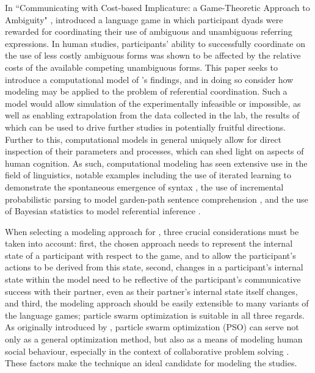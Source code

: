 \documentclass[12pt,a4paper]{article}
\begin{document}
In ``Communicating with Cost-based Implicature: a Game-Theoretic Approach to Ambiguity" \citeyearpar{rohde2012}, \citeauthor{rohde2012} introduced a language game in which participant dyads were rewarded for coordinating their use of ambiguous and unambiguous referring expressions. In human studies, participants' ability to successfully coordinate on the use of less costly ambiguous forms was shown to be affected by the relative costs of the available competing unambiguous forms. This paper seeks to introduce a computational model of \citeauthor{rohde2012}'s findings, and in doing so consider how modeling may be applied to the problem of referential coordination. Such a model would allow simulation of the experimentally infeasible or impossible, as well as enabling extrapolation from the data collected in the lab, the results of which can be used to drive further studies in potentially fruitful directions. Further to this, computational models in general uniquely allow for direct inspection of their parameters and processes, which can shed light on aspects of human cognition. As such, computational modeling has seen extensive use in the field of linguistics, notable examples including the use of iterated learning to demonstrate the spontaneous emergence of syntax \citep{kirby2002}, the use of incremental probabilistic parsing to model garden-path sentence comprehension \citep{hale2001}, and the use of Bayesian statistics to model referential inference \citep{frank2012}.

When selecting a modeling approach for \cite{rohde2012}, three crucial considerations must be taken into account: first, the chosen approach needs to represent the internal state of a participant with respect to the game, and to allow the participant's actions to be derived from this state, second, changes in a participant's internal state within the model need to be reflective of the participant's communicative success with their partner, even as their partner's internal state itself changes, and third, the modeling approach should be easily extensible to many variants of the \citeauthor{rohde2012} language games; particle swarm optimization is suitable in all three regards. As originally introduced by \citet*{kennedy1995}, particle swarm optimization (PSO) can serve not only as a general optimization method, but also as a means of modeling human social behaviour, especially in the context of collaborative problem solving \citep{kennedy1997}. These factors make the technique an ideal candidate for modeling the \citeauthor{rohde2012} studies. 
\end{document}
